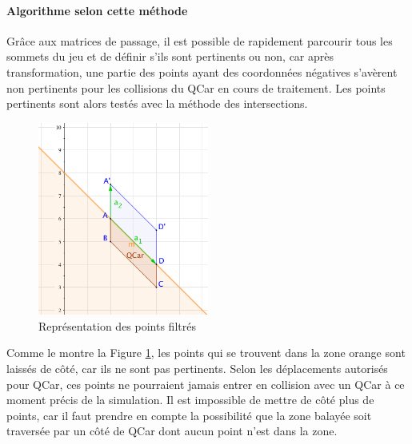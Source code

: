 \documentclass[a4paper, 12pt]{article}
\begin{document}
\paragraph{Algorithme selon cette méthode}
Grâce aux matrices de passage, il est possible de rapidement parcourir tous les sommets du jeu et de définir s'ils sont pertinents ou non, car après transformation, une partie des points ayant des coordonnées négatives s'avèrent non pertinents pour les collisions du QCar en cours de traitement. Les points pertinents sont alors testés avec la méthode des intersections.
\begin{figure}[H]
 \centering
 \includegraphics[width=0.5\textwidth]{includes/images/physique_conception_02}
 \caption{\label{fig:physique_conception_02}Représentation des points filtrés}
\end{figure}
Comme le montre la Figure \ref{fig:physique_conception_02}, les points qui se trouvent dans la zone orange sont laissés de côté, car ils ne sont pas pertinents. Selon les déplacements autorisés pour QCar, ces points ne pourraient jamais entrer en collision avec un QCar à ce moment précis de la simulation. Il est impossible de mettre de côté plus de points, car il faut prendre en compte la possibilité que la zone balayée soit traversée par un côté de QCar dont aucun point n'est dans la zone.
\end{document}
